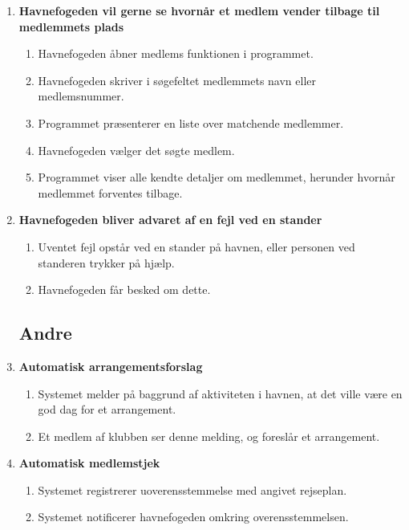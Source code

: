 \begin{enumerate}
    \item{\bf{Havnefogeden vil gerne se hvornår et medlem vender tilbage til medlemmets plads}}
      \begin{enumerate}
        \item Havnefogeden åbner medlems funktionen i programmet.
        \item Havnefogeden skriver i søgefeltet medlemmets navn eller medlemsnummer.
        \item Programmet præsenterer en liste over matchende medlemmer.
        \item Havnefogeden vælger det søgte medlem.
        \item Programmet viser alle kendte detaljer om medlemmet, herunder hvornår medlemmet forventes tilbage.
      \end{enumerate}

    \item{\bf{Havnefogeden bliver advaret af en fejl ved en stander}}
      \begin{enumerate}
        \item Uventet fejl opstår ved en stander på havnen, eller personen ved standeren trykker på hjælp.
        \item Havnefogeden får besked om dette.
      \end{enumerate}

\subsection{Andre}

	
    \item{\bf{Automatisk arrangementsforslag}}
      \begin{enumerate}
        \item Systemet melder på baggrund af aktiviteten i havnen, at det ville være en god dag for et arrangement.
        \item Et medlem af klubben ser denne melding, og foreslår et arrangement.
      \end{enumerate}

    \item{\bf{Automatisk medlemstjek}}
      \begin{enumerate}
        \item Systemet registrerer uoverensstemmelse med angivet rejseplan.
        \item Systemet notificerer havnefogeden omkring overensstemmelsen.
      \end{enumerate}


\end{enumerate}
